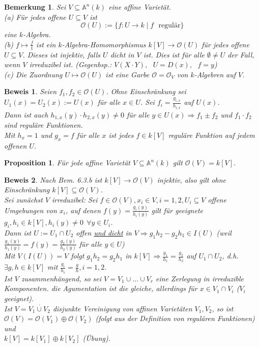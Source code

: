 \documentclass[a4paper,12pt]{report}
\theoremstyle{break}
\newtheorem{Bem}[Def]{Bemerkung}
\newtheorem{Prop}[Def]{Proposition}
\theoremstyle{nonumberbreak}
\theoremstyle{nonumberplain}
\newtheorem{Bew}{Beweis}
\begin{document}
\begin{Bem}
Sei $V\subseteq \mathbb{A}^n(k)$ eine affine Varietät.\\
(a) Für jedes offene $U\subseteq V$ ist
$$\mathcal{O}(U):= \{f: U \rightarrow k \mid f \textrm{~~regulär}\}$$
eine $k$-Algebra.\\
(b) $f\mapsto \frac{f}{1}$ ist ein $k$-Algebra-Homomorphismus $k[V]\rightarrow \mathcal{O}(U)$ für jedes offene $U\subseteq V$. Dieses ist injektiv, falls $U$ dicht in $V$ ist. Dies ist für alle $\emptyset\neq U$ der Fall, wenn $V$ irreduzibel ist. (Gegenbsp.: $V(X\cdot Y), ~~~U=D(x), ~~~f=y$)\\
(c) Die Zuordnung $U\mapsto \mathcal{O}(U)$ ist eine Garbe $\mathcal{O}=\mathcal{O}_V$ von $k$-Algebren auf $V$.
\end{Bem}
\begin{Bew}
Seien $f_1,f_2\in\mathcal{O}(U)$. Ohne Einschränkung sei $U_1(x)=U_2(x):=U(x)$ für alle $x\in U$.
Sei $f_i=\frac{g_{i,x}}{h_{i,x}}$ auf $U(x)$.\\
Dann ist auch $h_{1,x}(y)\cdot h_{2,x}(y)\neq 0$ für alle $y\in U(x) \Rightarrow f_1\pm f_2$ und $f_1\cdot f_2$ sind reguläre Funktionen.\\
Mit $h_x=1$ und $g_x=f$ für alle $x$ ist jedes $f\in k[V]$ reguläre Funktion auf jedem offenen $U$.
\end{Bew}
\begin{Prop}
Für jede affine Varietät $V\subseteq\mathbb{A}^n(k)$ gilt $\mathcal{O}(V)=k[V]$.
\end{Prop}
\begin{Bew} Nach Bem. 6.3.b ist $k[V] \rightarrow \mathcal{O}(V)$ injektiv, also gilt ohne Einschränkung $k[V]\subseteq \mathcal{O}(V)$.\\
Sei zunächst $V$ irreduzibel: Sei $f\in \mathcal{O}(V), x_i\in V, i=1,2, U_i\subseteq V$ offene Umgebungen von $x_i$, auf denen $f(y)=\frac{g_i(y)}{h_i(y)}$ gilt für geeignete $g_i,h_i\in k[V], h_i(y)\neq 0 ~~\forall y\in U_i$.\\
Dann ist $U:=U_1\cap U_2$ offen \underline{und dicht} in $V \Rightarrow g_1h_2-g_2h_1\in I(U)$ (weil $\frac{g_1(y)}{h_1(y)}=f(y)=\frac{g_2(y)}{h_2(y)}$ für alle $y\in U$)\\
Mit $V(I(U))=V$ folgt $g_1h_2=g_2h_1$ in $k[V]\Rightarrow \frac{g_1}{h_1}=\frac{g_2}{h_2}$ auf $U_1\cap U_2$, d.h. $\exists g,h\in k[V]$ mit $\frac{g_i}{h_i}=\frac{g}{h}, i=1,2$.\\
Ist $V$ zusammenhängend, so sei $V=V_1\cup ... \cup V_r$ eine Zerlegung in irreduzible Komponenten. die Agumentation ist die gleiche, allerdings für $x\in V_1\cap V_i$ ($V_i$ geeignet).\\
Ist  $V=V_1\stackrel{\cdot}{\cup} V_2$ disjunkte Vereinigung von affinen Varietäten $V_1,V_2$, so ist\\
$\mathcal{O}(V)=\mathcal{O}(V_1)\oplus\mathcal{O}(V_2)$ (folgt aus der Definition von regulären Funktionen) und\\
$k[V]=k[V_1]\oplus k[V_2]$ (Übung).
\end{Bew}
\end{document}
